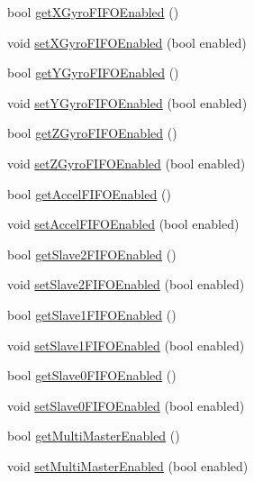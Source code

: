 \begin{DoxyCompactItemize}
bool \mbox{\hyperlink{class_m_p_u6050_ada9a553176b57815f23fb7d71bb85c9d}{get\+X\+Gyro\+F\+I\+F\+O\+Enabled}} ()
\item 
void \mbox{\hyperlink{class_m_p_u6050_a53a03d1f255a62f01375c870cdc85767}{set\+X\+Gyro\+F\+I\+F\+O\+Enabled}} (bool enabled)
\item 
bool \mbox{\hyperlink{class_m_p_u6050_a86c85d5b5c93df82394435b868e17463}{get\+Y\+Gyro\+F\+I\+F\+O\+Enabled}} ()
\item 
void \mbox{\hyperlink{class_m_p_u6050_a16eb12bbf07bc17a9d852941d834175e}{set\+Y\+Gyro\+F\+I\+F\+O\+Enabled}} (bool enabled)
\item 
bool \mbox{\hyperlink{class_m_p_u6050_adbbbd131c74f37dd545403633eb317ff}{get\+Z\+Gyro\+F\+I\+F\+O\+Enabled}} ()
\item 
void \mbox{\hyperlink{class_m_p_u6050_af5b5bc39b66466ba910f6eef1259444c}{set\+Z\+Gyro\+F\+I\+F\+O\+Enabled}} (bool enabled)
\item 
bool \mbox{\hyperlink{class_m_p_u6050_ace244415128ad7a38293ad6808b7face}{get\+Accel\+F\+I\+F\+O\+Enabled}} ()
\item 
void \mbox{\hyperlink{class_m_p_u6050_afccbee85f5cdc95098f6d62d8d417c3f}{set\+Accel\+F\+I\+F\+O\+Enabled}} (bool enabled)
\item 
bool \mbox{\hyperlink{class_m_p_u6050_a3c2e29508607a655221a2fa4f4219b4d}{get\+Slave2\+F\+I\+F\+O\+Enabled}} ()
\item 
void \mbox{\hyperlink{class_m_p_u6050_a38a10ac4f30b96718ec021dc0db8587b}{set\+Slave2\+F\+I\+F\+O\+Enabled}} (bool enabled)
\item 
bool \mbox{\hyperlink{class_m_p_u6050_afd6a9b55a589c83c9a0fb0b5b2a88234}{get\+Slave1\+F\+I\+F\+O\+Enabled}} ()
\item 
void \mbox{\hyperlink{class_m_p_u6050_a5d432fa2fb8b2227f50aa5c7b5befb66}{set\+Slave1\+F\+I\+F\+O\+Enabled}} (bool enabled)
\item 
bool \mbox{\hyperlink{class_m_p_u6050_a6aa7aa2e3fac06f8b5ab9ee127255a5e}{get\+Slave0\+F\+I\+F\+O\+Enabled}} ()
\item 
void \mbox{\hyperlink{class_m_p_u6050_a97fbf27e1b827f9dfc3c28ff376b54c4}{set\+Slave0\+F\+I\+F\+O\+Enabled}} (bool enabled)
\item 
bool \mbox{\hyperlink{class_m_p_u6050_aa88483068837bd9bc9c9f6c59a7a79b7}{get\+Multi\+Master\+Enabled}} ()
\item 
void \mbox{\hyperlink{class_m_p_u6050_a039f5724974c5bf3f373ed9be031441c}{set\+Multi\+Master\+Enabled}} (bool enabled)
\item 

\end{DoxyCompactItemize}
